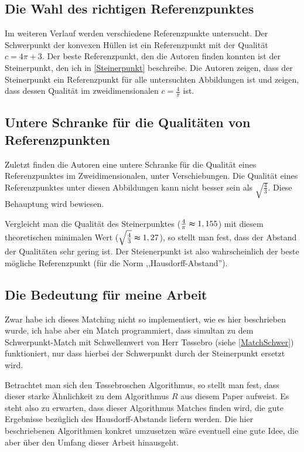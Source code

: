 \subsection{Die Wahl des richtigen Referenzpunktes}

Im weiteren Verlauf werden verschiedene Referenzpunkte untersucht. Der Schwerpunkt der konvexen Hüllen ist ein Referenzpunkt mit der Qualität $c=4\pi+3$. Der beste Referenzpunkt, den die Autoren finden konnten ist der Steinerpunkt, den ich in \ref{Steinerpunkt} beschreibe. Die Autoren zeigen, dass der Steinerpunkt ein Referenzpunkt für alle untersuchten Abbildungen ist und zeigen, dass dessen Qualität im zweidimensionalen $c=\frac{4}{\pi}$ ist. 

\subsection{Untere Schranke für die Qualitäten von Referenzpunkten}

Zuletzt finden die Autoren eine untere Schranke für die Qualität eines Referenzpunktes im Zweidimensionalen, unter Verschiebungen. Die Qualität eines Referenzpunktes unter diesen Abbildungen kann nicht besser sein als $\sqrt{\frac{4}{3}}$. Diese Behauptung wird bewiesen. 

Vergleicht man die Qualität des Steinerpunktes ($\frac{4}{\pi}\thickapprox 1,155$) mit diesem theoretischen minimalen Wert ($\sqrt{\frac{4}{3}}\thickapprox 1,27$), so stellt man fest, dass der Abstand der Qualitäten sehr gering ist. Der Steienerpunkt ist also wahrscheinlich der beste mögliche Referenzpunkt (für die Norm ,,Hausdorff-Abstand'').

\subsection{Die Bedeutung für meine Arbeit}\label{BedeutungAAR}

Zwar habe ich dieses Matching nicht so implementiert, wie es hier beschrieben wurde, ich habe aber ein Match programmiert, dass simultan zu dem Schwerpunkt-Match mit Schwellenwert von Herr T\o{}ssebro (siehe \ref{MatchSchwer}) funktioniert, nur dass hierbei der Schwerpunkt durch der Steinerpunkt ersetzt wird.

Betrachtet man sich den T\o{}ssebroschen Algorithmus, so stellt man fest, dass dieser starke Ähnlichkeit zu dem Algorithmus $R$ aus diesem Paper aufweist. Es steht also zu erwarten, dass dieser Algorithmus Matches finden wird, die gute Ergebnisse bezüglich des Hausdorff-Abstands liefern werden. Die hier beschriebenen Algorithmen konkret umzusetzen wäre eventuell eine gute Idee, die aber über den Umfang dieser Arbeit hinausgeht.


